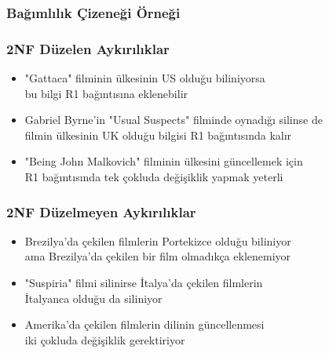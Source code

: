 \documentclass[dvipsnames]{beamer}
\theoremstyle{theorem}
\begin{document}
\begin{frame}
  \frametitle{Bağımlılık Çizeneği Örneği}

  \begin{center}
  \end{center}
\end{frame}

\begin{frame}
  \frametitle{2NF Düzelen Aykırılıklar}
  
  \hyperlink{example_db_2}{}

    \begin{itemize}
      \item "Gattaca" filminin ülkesinin US olduğu biliniyorsa\\
	bu bilgi R1 bağıntısına eklenebilir

      \pause
      \medskip
      \item Gabriel Byrne'in "Usual Suspects" filminde oynadığı silinse de\\
        filmin ülkesinin UK olduğu bilgisi R1 bağıntısında kalır

      \pause
      \medskip
      \item "Being John Malkovich" filminin ülkesini güncellemek için\\
        R1 bağıntısında tek çokluda değişiklik yapmak yeterli
    \end{itemize}
\end{frame}

\begin{frame}
  \frametitle{2NF Düzelmeyen Aykırılıklar}
  
  \hyperlink{example_db_2}{}

    \begin{itemize}
      \item Brezilya'da çekilen filmlerin Portekizce olduğu biliniyor\\
	ama Brezilya'da çekilen bir film olmadıkça eklenemiyor

      \pause
      \medskip
      \item "Suspiria" filmi silinirse İtalya'da çekilen filmlerin\\
        İtalyanca olduğu da siliniyor

      \pause
      \medskip
      \item Amerika'da çekilen filmlerin dilinin güncellenmesi\\
        iki çokluda değişiklik gerektiriyor
    \end{itemize}

\end{frame}
\end{document}
